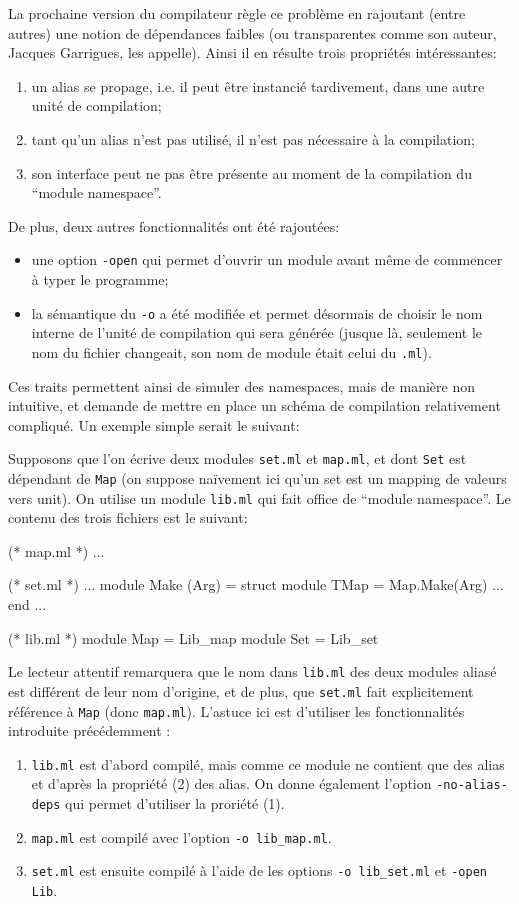 \documentclass[11pt,a4paper]{report}
\begin{document}
La prochaine version du compilateur règle ce problème en rajoutant (entre
autres) une notion de dépendances faibles (ou transparentes comme son auteur,
Jacques Garrigues, les appelle). Ainsi il en résulte trois propriétés
intéressantes:
\begin{enumerate}
\item un alias se propage, i.e. il peut être instancié tardivement, dans une
  autre unité de compilation;
\item tant qu'un alias n'est pas utilisé, il n'est pas nécessaire à la
  compilation; 
\item son interface peut ne pas être présente au moment de la compilation du
  ``module namespace''.
\end{enumerate}
De plus, deux autres fonctionnalités ont été rajoutées:
\begin{itemize}
\item une option \texttt{-open} qui permet d'ouvrir un module avant même de
  commencer à typer le programme;
\item la sémantique du \texttt{-o} a été modifiée et permet désormais de choisir
  le nom interne de l'unité de compilation qui sera générée (jusque là,
  seulement le nom du fichier changeait, son nom de module était celui du
  \texttt{.ml}).
\end{itemize}

Ces traits permettent ainsi de simuler des namespaces, mais de manière non
intuitive, et demande de mettre en place un schéma de compilation relativement
compliqué. Un exemple simple serait le suivant:

Supposons que l'on écrive deux modules \texttt{set.ml} et \texttt{map.ml}, et
dont \texttt{Set} est dépendant de \texttt{Map} (on suppose naïvement ici qu'un
set est un mapping de valeurs vers unit). On utilise un module \texttt{lib.ml}
qui fait office de ``module namespace''. Le contenu des trois fichiers est le
suivant:

\begin{OCaml}
(* map.ml *)
...

(* set.ml *)
...
module Make (Arg) =
struct
  module TMap = Map.Make(Arg)
  ...
end
...

(* lib.ml *)
module Map = Lib_map
module Set = Lib_set
\end{OCaml}

Le lecteur attentif remarquera que le nom dans \texttt{lib.ml} des deux modules
aliasé est différent de leur nom d'origine, et de plus, que \texttt{set.ml} fait
explicitement référence à \texttt{Map} (donc \texttt{map.ml}). L'astuce ici est
d'utiliser les fonctionnalités introduite précédemment :
\begin{enumerate}
\item \texttt{lib.ml} est d'abord compilé, mais comme ce module ne contient que
  des alias et d'après la propriété (2) des alias. On donne également l'option
  \texttt{-no-alias-deps} qui permet d'utiliser la proriété (1).
\item \texttt{map.ml} est compilé avec l'option \texttt{-o lib\_map.ml}.
\item \texttt{set.ml} est ensuite compilé à l'aide de les options \texttt{-o
  lib\_set.ml} et \texttt{-open Lib}.
\end{enumerate}
\end{document}
